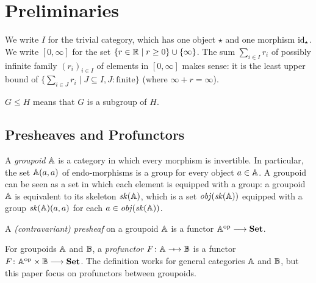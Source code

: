 \section{Preliminaries}

We write \( I \) for the trivial category, which has one object \( \star \) and one morphism \( \mathrm{id}_\star \).
We write \( [0, \infty] \) for the set \( \{ r \in \mathbb{R} \mid r \ge 0 \} \cup \{ \infty \} \).
The sum \( \sum_{i \in I} r_i \) of possibly infinite family \( (r_i)_{i \in I} \) of elements in \( [0,\infty] \) makes sense: it is the least upper bound of \( \{ \sum_{i \in J} r_i \mid J \subseteq I, J \colon \mbox{finite} \} \) (where \( \infty + r = \infty \)). 

\newcommand{\subgroup}{\le}
\( G \subgroup H \) means that \( G \) is a subgroup of \( H \).


\subsection{Presheaves and Profunctors}

\newcommand{\Object}{\mathit{obj}}
\newcommand{\Skeleton}{\mathit{sk}}

A \emph{groupoid} \( \mathbb{A} \) is a category in which every morphism is invertible.
In particular, the set \( \mathbb{A}(a,a) \) of endo-morphisms is a group for every object \( a \in \mathbb{A} \).
A groupoid can be seen as a set in which each element is equipped with a group: a groupoid \( \mathbb{A} \) is equivalent to its skeleton \( \Skeleton(\Grp) \), which is a set \( \Object(\Skeleton(\Grp)) \) equipped with a group \( \Skeleton(\Grp)(a, a) \) for each \( a \in \Object(\Skeleton(\Grp)) \).

A \emph{(contravariant) presheaf} on a groupoid \( \mathbb{A} \) is a functor \( \mathbb{A}^{\mathrm{op}} \longrightarrow \mathbf{Set} \).

For groupoids \( \mathbb{A} \) and \( \mathbb{B} \), a \emph{profunctor} \( F \colon \Grp \profarrow \Grpb \) is a functor \( F \colon \mathbb{A}^{\mathrm{op}} \times \mathbb{B} \longrightarrow \mathbf{Set} \).
The definition works for general categories \( \mathbb{A} \) and \( \mathbb{B} \), but this paper focus on profunctors between groupoids.


